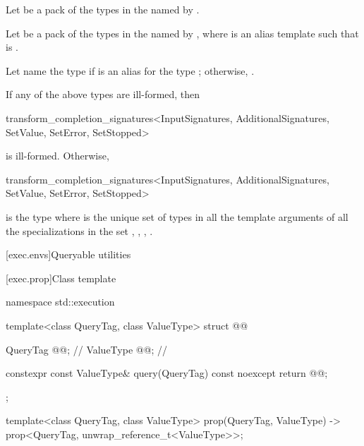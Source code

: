 \pnum
Let  be a pack of the types in the  named by
.

\pnum
Let  be a pack of the types in the  named by
,
where  is an alias template
such that  is
.

\pnum
Let  name the type  if
is an alias for the type ;
otherwise, .

\pnum
If any of the above types are ill-formed,
then
\begin{codeblock}
transform_completion_signatures<InputSignatures, AdditionalSignatures,
                                SetValue, SetError, SetStopped>
\end{codeblock}
is ill-formed.
Otherwise,
\begin{codeblock}
transform_completion_signatures<InputSignatures, AdditionalSignatures,
                                SetValue, SetError, SetStopped>
\end{codeblock}
is the type 
where  is the unique set of types in all the template arguments
of all the  specializations in the set
, , , .

[exec.envs]{Queryable utilities}

[exec.prop]{Class template }

\begin{codeblock}
namespace std::execution {
  template<class QueryTag, class ValueType>
  struct @@ {
    QueryTag @@;            // \expos
    ValueType @@;           // \expos

    constexpr const ValueType& query(QueryTag) const noexcept {
      return @@;
    }
  };

  template<class QueryTag, class ValueType>
    prop(QueryTag, ValueType) -> prop<QueryTag, unwrap_reference_t<ValueType>>;
}
\end{codeblock}

